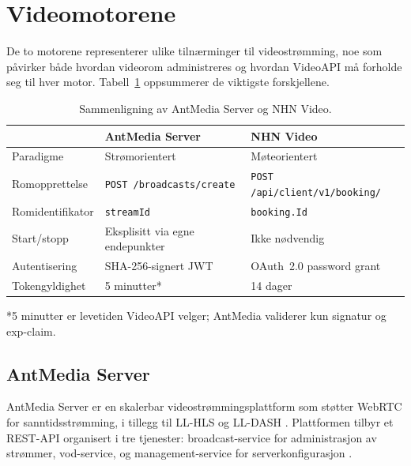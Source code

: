 \section{Videomotorene}
\label{sec:videomotorer}
De to motorene representerer ulike tilnærminger til videostrømming, noe som påvirker både hvordan videorom administreres og hvordan VideoAPI må forholde seg til hver motor. Tabell~\ref{tab:videomotorer} oppsummerer de viktigste forskjellene.

\begin{table}[h]
\centering
\caption{Sammenligning av AntMedia Server og NHN Video.}
\label{tab:videomotorer}
\begin{tabular}{lll}
\toprule
& \textbf{AntMedia Server} & \textbf{NHN Video} \\
\midrule
Paradigme         & Strømorientert                  & Møteorientert \\
Romopprettelse    & \texttt{POST /broadcasts/create} & \texttt{POST /api/client/v1/booking/} \\
Romidentifikator  & \texttt{streamId}               & \texttt{booking.Id} \\
Start/stopp       & Eksplisitt via egne endepunkter & Ikke nødvendig \\
Autentisering     & SHA-256-signert JWT             & OAuth~2.0 password grant \\
Tokengyldighet    & 5 minutter{*}                      & 14 dager \\
\bottomrule
\end{tabular}
\begin{tablenotes}
\footnotesize
\item {*}5 minutter er levetiden VideoAPI velger; AntMedia validerer kun signatur og exp-claim.
\end{tablenotes}
\end{table}

\subsection{AntMedia Server}
\label{sec:antmedia}

AntMedia Server er en skalerbar videostrømmingsplattform som støtter WebRTC for sanntidsstrømming, i tillegg til \gls{LL-HLS} og \gls{LL-DASH} \cite{antmedia_intro}. Plattformen tilbyr et REST-API organisert i tre tjenester: \Gls{broadcast-service} for administrasjon av strømmer, \gls{vod-service}, og \Gls{management-service} for serverkonfigurasjon \cite{antmedia_rest}.

